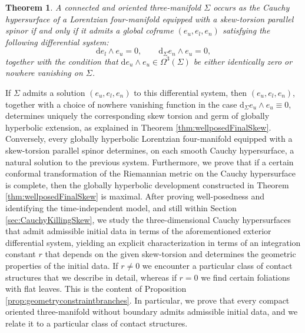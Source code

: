\documentclass[10pt,reqno,a4paper]{amsart}
\theoremstyle{plain}
\newtheorem{thm}{Theorem}[section]
\theoremstyle{definition}
\theoremstyle{remark}
\theoremstyle{remark}
\def\dd{\mathrm{d}}
\renewcommand{\(}{ (}
\renewcommand{\)}{ )}
\begin{document}
\begin{thm}
A connected and oriented three-manifold $\Sigma$ occurs as the Cauchy hypersurface of a Lorentzian four-manifold equipped with a skew-torsion parallel spinor if and only if it admits a global coframe $(e_u,e_l,e_n)$ satisfying the following differential system:
\begin{equation*} 
\dd  e_l\wedge e_u=0,  \qquad \dd_\Sigma e_n\wedge e_u=0,  
\end{equation*}
together with the condition that $\dd e_u \wedge e_u \in \Omega^3(\Sigma)$ be either identically zero or nowhere vanishing on $\Sigma$.
\end{thm}  

If $\Sigma$ admits a solution $(e_u,e_l,e_n)$ to this differential system, then $(e_u,e_l,e_n)$, together with a choice of nowhere vanishing function in the case $\dd_{\Sigma} e_u \wedge e_u \equiv 0$, determines uniquely the corresponding skew torsion and germ of globally hyperbolic extension, as explained in Theorem \ref{thm:wellposedFinalSkew}. Conversely, every globally hyperbolic Lorentzian four-manifold equipped with a skew-torsion parallel spinor determines, on each smooth Cauchy hypersurface, a natural solution to the previous system. Furthermore, we prove that if a certain conformal transformation of the Riemannian metric on the Cauchy hypersurface is complete, then the globally hyperbolic development constructed in Theorem \ref{thm:wellposedFinalSkew} is maximal. After proving well-posedness and identifying the time-independent model, and still within Section \ref{sec:CauchyKillingSkew}, we study the three-dimensional Cauchy hypersurfaces that admit admissible initial data in terms of the aforementioned exterior differential system, yielding an explicit characterization in terms of an integration constant $r$ that depends on the given skew-torsion and determines the geometric properties of the initial data. If $r\neq 0$ we encounter a particular class of contact structures that we describe in detail, whereas if $r=0$ we find certain foliations with flat leaves. This is the content of Proposition \ref{prop:geometryconstraintbranches}. In particular, we prove that every compact oriented three-manifold without boundary admits admissible initial data, and we relate it to a particular class of contact structures. \medskip
\end{document}
